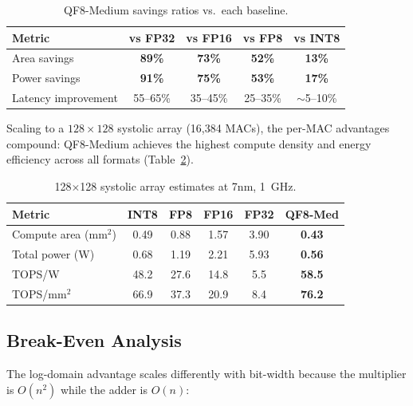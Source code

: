 \documentclass[11pt,letterpaper]{article}
\theoremstyle{definition}
\theoremstyle{remark}
\begin{document}
\begin{table}[ht!]
\centering
\caption{QF8-Medium savings ratios vs.\ each baseline.}
\label{tab:savings-ratios}
\begin{tabular}{@{}lcccc@{}}
\toprule
Metric & vs FP32 & vs FP16 & vs FP8 & vs INT8 \\
\midrule
Area savings    & \textbf{89\%} & \textbf{73\%} & \textbf{52\%} & \textbf{13\%}  \\
Power savings   & \textbf{91\%} & \textbf{75\%} & \textbf{53\%} & \textbf{17\%}  \\
Latency improvement & 55--65\% & 35--45\% & 25--35\% & $\sim$5--10\% \\
\bottomrule
\end{tabular}
\end{table}

Scaling to a $128 \times 128$ systolic array (16{,}384 MACs), the per-MAC
advantages compound: QF8-Medium achieves the highest compute density and
energy efficiency across all formats (Table~\ref{tab:systolic}).

\begin{table}[ht!]
\centering
\caption{128$\times$128 systolic array estimates at 7nm, 1~GHz.}
\label{tab:systolic}
\begin{tabular}{@{}lccccc@{}}
\toprule
Metric & INT8 & FP8 & FP16 & FP32 & \textbf{QF8-Med} \\
\midrule
Compute area (mm$^2$) & 0.49 & 0.88 & 1.57 & 3.90 & \textbf{0.43} \\
Total power (W)        & 0.68 & 1.19 & 2.21 & 5.93 & \textbf{0.56} \\
TOPS/W                 & 48.2 & 27.6 & 14.8 & 5.5  & \textbf{58.5} \\
TOPS/mm$^2$            & 66.9 & 37.3 & 20.9 & 8.4  & \textbf{76.2} \\
\bottomrule
\end{tabular}
\end{table}

\subsection{Break-Even Analysis}

The log-domain advantage scales differently with bit-width because the
multiplier is $O(n^2)$ while the adder is $O(n)$:
\end{document}

